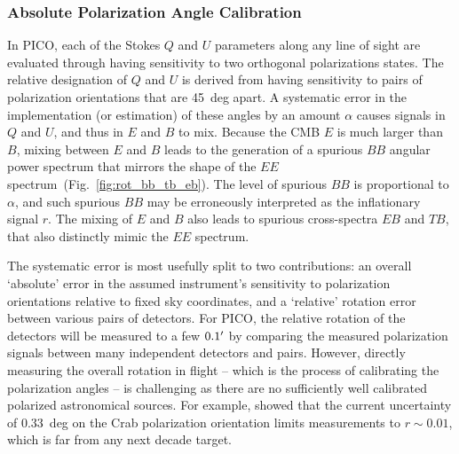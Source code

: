 \documentclass[PICOReport.tex]{subfiles}
\begin{document}


\subsubsection{Absolute Polarization Angle Calibration}
\label{sec:angle}

In PICO, each of the Stokes $Q$ and $U$ parameters along any line of sight are evaluated through having sensitivity to two orthogonal polarizations states. The relative designation of $Q$ and $U$ is derived from having sensitivity to pairs of polarization orientations that are 45~deg apart. A systematic error in the implementation (or estimation) of these angles by an amount $\alpha$ causes signals in $Q$ and $U$, and thus in $E$ and $B$ to mix. Because the CMB $E$ is much larger than $B$, mixing between $E$ and $B$ leads to the generation of a spurious $BB$ angular power spectrum that mirrors the shape of the $EE$ spectrum~(Fig.~\ref{fig:rot_bb_tb_eb}). The level of spurious $BB$ is proportional to $\alpha$, and such spurious $BB$ may be erroneously interpreted as the inflationary signal $r$.   The mixing of $E$ and $B$ also leads to spurious cross-spectra $EB$ and $TB$, that also distinctly mimic the $EE$ spectrum. 

The systematic error is most usefully split to two contributions: an overall `absolute' error in the assumed instrument's sensitivity to polarization orientations relative to fixed sky coordinates, and a `relative' rotation error between various pairs of detectors. For PICO, the relative rotation of the detectors will be measured to a few $0.1'$ by comparing the measured polarization signals between many independent detectors and pairs. However, directly measuring the overall rotation in flight -- which is the process of calibrating the polarization angles --  is challenging as there are no sufficiently well calibrated polarized astronomical sources. For example, \citet{Aumont+2018} showed that the current uncertainty of $0.33$~deg on the Crab polarization orientation limits measurements to $r \sim 0.01$, which is far from any next decade target. 
\end{document}
